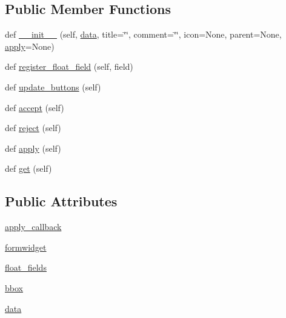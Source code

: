 \subsection*{Public Member Functions}
\begin{DoxyCompactItemize}
\item 
def \hyperlink{classmatplotlib_1_1backends_1_1qt__editor_1_1__formlayout_1_1FormDialog_a70c741764d8c057e6e2c60a4c37a9cde}{\+\_\+\+\_\+init\+\_\+\+\_\+} (self, \hyperlink{classmatplotlib_1_1backends_1_1qt__editor_1_1__formlayout_1_1FormDialog_a4e05c6bb756fb1a5176089bab858dd4d}{data}, title=\char`\"{}\char`\"{}, comment=\char`\"{}\char`\"{}, icon=None, parent=None, \hyperlink{classmatplotlib_1_1backends_1_1qt__editor_1_1__formlayout_1_1FormDialog_a7237b231577ea176669fffd9b80c9c4c}{apply}=None)
\item 
def \hyperlink{classmatplotlib_1_1backends_1_1qt__editor_1_1__formlayout_1_1FormDialog_a17c036ef121fc1fe4857d8cc203967d6}{register\+\_\+float\+\_\+field} (self, field)
\item 
def \hyperlink{classmatplotlib_1_1backends_1_1qt__editor_1_1__formlayout_1_1FormDialog_a0792a281244c9168b8528374eb3871b0}{update\+\_\+buttons} (self)
\item 
def \hyperlink{classmatplotlib_1_1backends_1_1qt__editor_1_1__formlayout_1_1FormDialog_a49ec8eab0cc5dd3908a24d1e0d8dc42d}{accept} (self)
\item 
def \hyperlink{classmatplotlib_1_1backends_1_1qt__editor_1_1__formlayout_1_1FormDialog_abbdcb86a72739cbbf61b82aeda3afff0}{reject} (self)
\item 
def \hyperlink{classmatplotlib_1_1backends_1_1qt__editor_1_1__formlayout_1_1FormDialog_a7237b231577ea176669fffd9b80c9c4c}{apply} (self)
\item 
def \hyperlink{classmatplotlib_1_1backends_1_1qt__editor_1_1__formlayout_1_1FormDialog_a5900fbc24a377469b1cdde7f6957778f}{get} (self)
\end{DoxyCompactItemize}
\subsection*{Public Attributes}
\begin{DoxyCompactItemize}
\item 
\hyperlink{classmatplotlib_1_1backends_1_1qt__editor_1_1__formlayout_1_1FormDialog_a963b3f2edb7a49cc934a64970700ad6c}{apply\+\_\+callback}
\item 
\hyperlink{classmatplotlib_1_1backends_1_1qt__editor_1_1__formlayout_1_1FormDialog_a01c2a54460e601afd86cc162615480c6}{formwidget}
\item 
\hyperlink{classmatplotlib_1_1backends_1_1qt__editor_1_1__formlayout_1_1FormDialog_a2ed30adaee52220b3523259e827efc95}{float\+\_\+fields}
\item 
\hyperlink{classmatplotlib_1_1backends_1_1qt__editor_1_1__formlayout_1_1FormDialog_ac1fc96222239397a67a0bcd4e9675a12}{bbox}
\item 
\hyperlink{classmatplotlib_1_1backends_1_1qt__editor_1_1__formlayout_1_1FormDialog_a4e05c6bb756fb1a5176089bab858dd4d}{data}
\end{DoxyCompactItemize}


